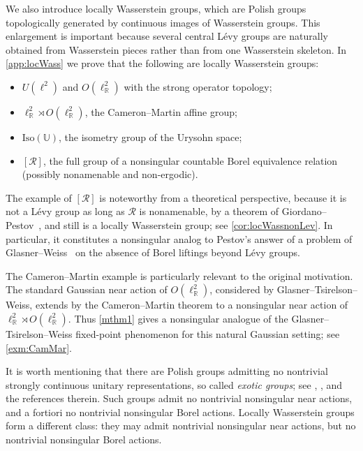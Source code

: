 \documentclass{amsart}
\numberwithin{equation}{subsection}
\theoremstyle{plain}
\theoremstyle{definition}
\theoremstyle{plain}
\begin{document}
We also introduce locally Wasserstein groups, which are Polish groups topologically generated by continuous images of Wasserstein groups. This enlargement is important because several central L\'{e}vy groups are naturally obtained from Wasserstein pieces rather than from one Wasserstein skeleton. In \cref{app:locWass} we prove that the following are locally Wasserstein groups:
\begin{itemize}
    \item \(U\left(\ell^{2}\right)\) and \(O\left(\ell_{\mathbb{R}}^{2}\right)\) with the strong operator topology;
    \item \(\ell_{\mathbb{R}}^{2}\rtimes O\left(\ell_{\mathbb{R}}^{2}\right)\), the Cameron--Martin affine group;
    \item \(\mathrm{Iso}\left(\mathbb{U}\right)\), the isometry group of the Urysohn space;
    \item \(\left[\mathcal{R}\right]\), the full group of a nonsingular countable Borel equivalence relation (possibly nonamenable and non-ergodic).
\end{itemize}

The example of \(\left[\mathcal{R}\right]\) is noteworthy from a theoretical perspective, because it is not a L\'{e}vy group as long as \(\mathcal{R}\) is nonamenable, by a theorem of Giordano--Pestov~\cite[Thm.~5.7]{giordano2007some}, and still is a locally Wasserstein group; see \cref{cor:locWassnonLev}. In particular, it constitutes a nonsingular analog to Pestov's answer \cite{Pestov2010} of a problem of Glasner--Weiss~\cite[Problem~2]{glasner2005spatial} on the absence of Borel liftings beyond L\'{e}vy groups.

\smallskip

The Cameron--Martin example is particularly relevant to the original motivation. The standard Gaussian near action of \(O\left(\ell_{\mathbb{R}}^{2}\right)\), considered by Glasner--Tsirelson--Weiss, extends by the Cameron--Martin theorem to a nonsingular near action of \(\ell_{\mathbb{R}}^{2}\rtimes O\left(\ell_{\mathbb{R}}^{2}\right)\). Thus \cref{mthm1} gives a nonsingular analogue of the Glasner--Tsirelson--Weiss fixed-point phenomenon for this natural Gaussian setting; see \cref{exm:CamMar}.

\smallskip

It is worth mentioning that there are Polish groups admitting no nontrivial strongly continuous unitary representations, so called \emph{exotic groups}; see \cite[Rem.~1.7]{glasner2005automorphism}, \cite[pp.~156-157]{Pestov2006}, \cite{schneider2025groups} and the references therein. Such groups admit no nontrivial nonsingular near actions, and a fortiori no nontrivial nonsingular Borel actions. Locally Wasserstein groups form a different class: they may admit nontrivial nonsingular near actions, but no nontrivial nonsingular Borel actions.
\end{document}
